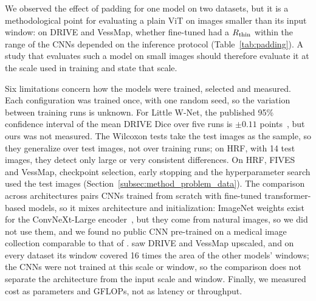 We observed the effect of padding for one model on two datasets, but it is a methodological point for evaluating a plain ViT on images smaller than its input window: on DRIVE and VessMap, whether fine-tuned \medsam{} had a $R_{\mathrm{thin}}$ within the range of the CNNs depended on the inference protocol (Table~\ref{tab:padding}). A study that evaluates such a model on small images should therefore evaluate it at the scale used in training and state that scale.

Six limitations concern how the models were trained, selected and measured. Each configuration was trained once, with one random seed, so the variation between training runs is unknown. For Little W-Net, the published 95\% confidence interval of the mean DRIVE Dice over five runs is $\pm 0.11$ points~\cite{galdran2020littlewnetcouldstateoftheart}, but ours was not measured. The Wilcoxon tests take the test images as the sample, so they generalize over test images, not over training runs; on HRF, with 14 test images, they detect only large or very consistent differences. On HRF, FIVES and VessMap, checkpoint selection, early stopping and the hyperparameter search used the test images (Section~\ref{subsec:method_problem_data}). The comparison across architectures pairs CNNs trained from scratch with fine-tuned transformer-based models, so it mixes architecture and initialization: ImageNet weights exist for the ConvNeXt-Large encoder~\cite{liu2022convnet}, but they come from natural images, so we did not use them, and we found no public CNN pre-trained on a medical image collection comparable to that of \medsam{}. \medsam{} saw DRIVE and VessMap upscaled, and on every dataset its window covered 16 times the area of the other models' windows; the CNNs were not trained at this scale or window, so the comparison does not separate the architecture from the input scale and window. Finally, we measured cost as parameters and GFLOPs, not as latency or throughput.
